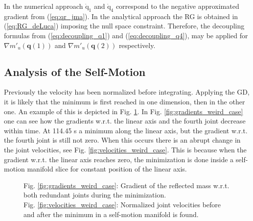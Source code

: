 In the numerical approach $\mathrm{{\dot{q}}_{1}}$ and $\mathrm{{\dot{q}}_{4}}$ correspond to the negative approximated gradient from (\ref{eq:qr_jma}). In the analytical approach the RG is obtained in (\ref{eq:RG_deLuca}) imposing the null space constraint. Therefore, the decoupling formulas from (\ref{eq:decoupling_q1}) and (\ref{eq:decoupling_q4}), may be applied  for $\nabla m'_u(\mathbf{q}(1))$ and  $\nabla m'_u(\mathbf{q}(2))$ respectively.



\subsection{Analysis of the Self-Motion}





Previously the velocity has been normalized before integrating. Applying the GD, it is likely that the minimum is first reached in one dimension, then in the other one. An example of this is depicted in Fig. \ref{fig:weird case}. In  Fig. \ref{fig:gradients_weird_case} one can see how the gradients w.r.t. the linear axis %
and the fourth joint %
decrease within time. At 114.45 s a minimum along the linear axis, but the gradient w.r.t. the fourth joint is still not zero. When this occurs there is an abrupt change in the joint velocities, see Fig. \ref{fig:velocities_weird_case}.
This is because when the gradient w.r.t. the linear axis %
reaches zero, the minimization is done inside a self-motion manifold slice for constant position of the linear axis.

\begin{figure}[!htb]
	\centering	
	 	 	 	
	\caption{Fig. \ref{fig:gradients_weird_case}: Gradient of the reflected mass w.r.t. both redundant joints during the minimization. \\ Fig.  \ref{fig:velocities_weird_case}: Normalized joint velocities before and after the minimum in a self-motion manifold is found. }
	\label{fig:weird case}
\end{figure} 






